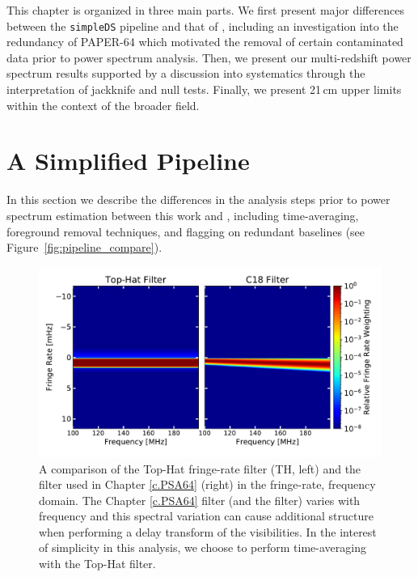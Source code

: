 This chapter is organized in three main parts. We first present major differences between the \texttt{simpleDS} pipeline and that of , including an investigation into the redundancy of PAPER-64 which motivated the removal of certain contaminated data prior to power spectrum analysis. Then, we present our multi-redshift power spectrum results supported by a discussion into systematics through the interpretation of jackknife and null tests. Finally, we present 21\,cm upper limits within the context of the broader field. 

\section{A Simplified Pipeline}

In this section we describe the differences in the analysis steps prior to power spectrum estimation
 between this work and , including time-averaging, foreground removal techniques, and flagging on redundant baselines (see Figure~\ref{fig:pipeline_compare}).

\begin{figure}
\centering
\includegraphics[width=.85\textwidth]{plots/frf_comparison_waterfall.pdf}
\caption{A comparison of the Top-Hat fringe-rate filter (TH, left) and the filter used in Chapter \ref{c.PSA64} (right) in the fringe-rate, frequency domain.
The Chapter \ref{c.PSA64} filter (and the \citet{ali_et_al2015} filter)
varies with frequency and this spectral
variation can cause additional structure
when performing a delay transform of the visibilities. In the interest of simplicity
in this analysis, we choose to perform time-averaging with the
Top-Hat filter.
}\label{fig:FRF_response}
\end{figure}

